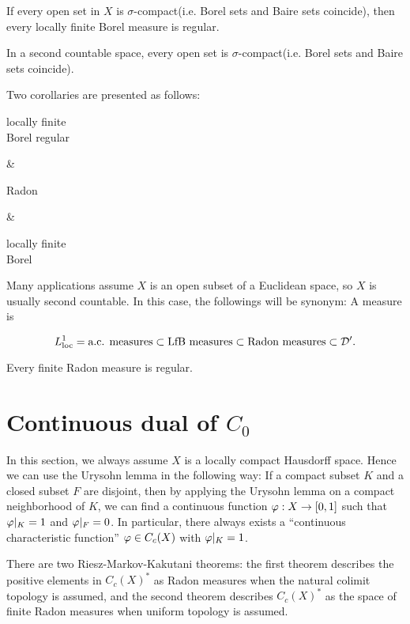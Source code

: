 \documentclass{../note}
\begin{document}
\begin{thm}
If every open set in $X$ is $\sigma$-compact(i.e. Borel sets and Baire sets coincide), then every locally finite Borel measure is regular.
\end{thm}
\begin{prop}
In a second countable space, every open set is $\sigma$-compact(i.e. Borel sets and Baire sets coincide).
\end{prop}


Two corollaries are presented as follows:
\begin{rd}[column sep={120pt,between origins}]
\parbox{7em}{\centering locally finite \\ Borel regular}  &
\parbox{5em}{\centering Radon}     &
\parbox{7em}{\centering locally finite \\ Borel}  
\end{rd}


Many applications assume $X$ is an open subset of a Euclidean space, so $X$ is usually second countable.
In this case, the followings will be synonym: A measure is
\begin{parts}
\item 
\end{parts}



\[L_{\text{loc}}^1=\text{a.c. measures}\subset\text{LfB measures}\subset\text{Radon measures}\subset\mathcal{D}'.\]


\begin{thm}
Every finite Radon measure is regular.
\end{thm}







\section{Continuous dual of $C_0$}
In this section, we always assume $X$ is a locally compact Hausdorff space.
Hence we can use the Urysohn lemma in the following way: If a compact subset $K$ and a closed subset $F$ are disjoint, then by applying the Urysohn lemma on a compact neighborhood of $K$, we can find a continuous function $\varphi:X\to[0,1]$ such that $\varphi|_K=1$ and $\varphi|_F=0$.
In particular, there always exists a ``continuous characteristic function'' $\varphi\in C_c(X)$ with $\varphi|_K=1$.

There are two Riesz-Markov-Kakutani theorems: the first theorem describes the positive elements in $C_c(X)^*$ as Radon measures when the natural colimit topology is assumed, and the second theorem describes $C_c(X)^*$ as the space of finite Radon measures when uniform topology is assumed.
\end{document}
